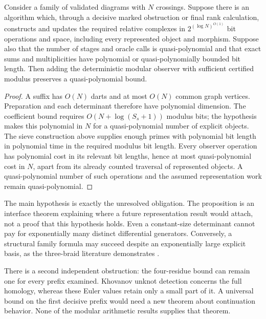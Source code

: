 \begin{proposition}
\label{prop:conditional}
Consider a family of validated diagrams with $N$ crossings. Suppose there is
an algorithm which, through a decisive marked obstruction or final rank
calculation, constructs and updates the required relative complexes in
$2^{(\log N)^{O(1)}}$ bit operations and space, including every represented
object and morphism. Suppose also that the number of stages and oracle calls
is quasi-polynomial and that exact sums and multiplicities have polynomial or
quasi-polynomially bounded bit length. Then adding the deterministic modular
observer with sufficient certified modulus preserves a quasi-polynomial bound.
\end{proposition}
\begin{proof}
A suffix has $O(N)$ darts and at most $O(N)$ common graph vertices. Preparation
and each determinant therefore have polynomial dimension. The coefficient
bound requires $O(N+\log(S_s+1))$ modulus bits; the hypothesis makes this
polynomial in $N$ for a quasi-polynomial number of explicit objects.
The sieve construction above supplies enough primes with polynomial bit
length in polynomial time in the required modulus bit length. Every observer
operation has polynomial cost in its relevant bit lengths, hence at most
quasi-polynomial cost in $N$, apart from its already counted traversal of
represented objects. A quasi-polynomial number of such operations and the
assumed representation work remain quasi-polynomial.
\end{proof}

The main hypothesis is exactly the unresolved obligation. The proposition is
an interface theorem explaining where a future representation result would
attach, not a proof that this hypothesis holds. Even a constant-size determinant
cannot pay for exponentially many distinct differential generators. Conversely,
a structural family formula may succeed despite an exponentially large explicit
basis, as the three-braid literature demonstrates \cite{kelomaki}.

There is a second independent obstruction: the four-residue bound can remain
one for every prefix examined. Khovanov unknot detection concerns the full
homology, whereas these Euler values retain only a small part of it. A universal
bound on the first decisive prefix would need a new theorem about continuation
behavior. None of the modular arithmetic results supplies that theorem.
